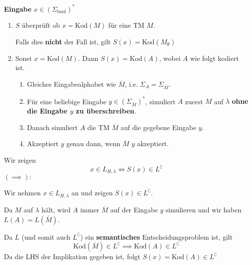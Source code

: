     
    

        \textbf{Eingabe} $x \in (\Sigma_{\text{bool}})^*$
    
        \begin{enumerate}[label=\arabic*.]
            
            \item $S$ überprüft ob $x = \text{Kod}(M)$ für eine TM $M$.
            
            Falls dies \textbf{nicht} der Fall ist, gilt $S(x) = \text{Kod}(M_{\emptyset})$
            
            \item Sonst $x = \text{Kod}(M)$. Dann $S(x) = \text{Kod}(A)$, wobei $A$ wie folgt kodiert ist.
            \begin{enumerate}[label=\roman*.]
                \item Gleiches Eingabealphabet wie $\overline{M}$, i.e. $\Sigma_A = \Sigma_{\overline{M}}$.
                
                \item Für eine beliebige Eingabe $y \in (\Sigma_{\overline{M}})^*$, 
                simuliert $A$ zuerst $M$ auf $\lambda$ \textbf{ohne die Eingabe $y$ zu überschreiben}.
                
                \item Danach simuliert $A$ die TM $\overline{M}$ auf die gegebene Eingabe $y$.
                \item Akzeptiert $y$ genau dann, wenn $\overline{M}$ $y$ akzeptiert.
            \end{enumerate}
        \end{enumerate}
    
    
    

        Wir zeigen 
        $$x \in L_{H, \lambda} \iff S(x) \in L^\complement$$
        $\mathbf{(\implies):}$
        
        Wir nehmen \textbf{$x \in L_{H, \lambda}$} an und zeigen $S(x) \in L^\complement$.
        
        
        Da $M$ auf $\lambda$ hält, wird $A$ immer $\overline{M}$ auf der Eingabe $y$ simulieren und wir haben $L(A) = L(\overline{M})$.
    
        
        Da $L$ (und somit auch $L^\complement$) ein \textbf{semantisches} Entscheidungsproblem ist, gilt 
        $$\text{Kod}(\overline{M}) \in L^\complement \implies \text{Kod}(A) \in L^\complement$$
        Da die LHS der Implikation gegeben ist, folgt $S(x) = \text{Kod}(A) \in L^\complement$
            
